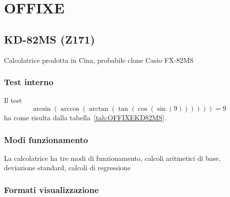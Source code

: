 \chapter{OFFIXE}
\section{KD-82MS (Z171)}
Calcolatrice prodotta in Cina, probabile clone Casio FX-82MS
\subsection{Test interno}
Il test\[\arcsin(\arccos(\arctan(\tan(\cos(\sin(9))))))=9\] ha come risulta dalla tabella~\vref{tab:OFFIXEKD82MS}. 
\subsection{Modi funzionamento}
La calcolatrice ha tre modi di funzionamento, calcoli aritmetici di base, deviazione standard, calcoli di regressione
\subsection{Formati visualizzazione}
\CASIOmodediplayexp

